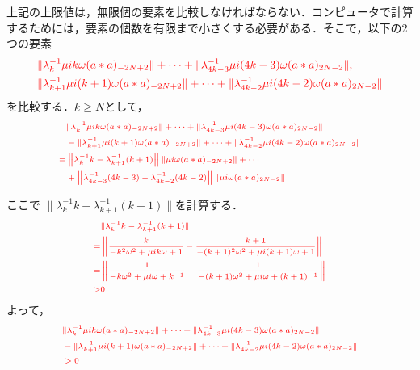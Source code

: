 \documentclass[11pt,a4paper,titlepage]{jsreport}
\theoremstyle{definition}
\providecommand{\DIFdel}[1]{{\protect\color{red} \scriptsize #1}} %
\begin{document}
\begin{enumerate}
\DIFdel{上記の上限値は，無限個の要素を比較しなければならない．コンピュータで計算するためには，要素の個数を有限まで小さくする必要がある．そこで，以下の2つの要素
}\begin{align*}
  &\DIFdel{\|\lambda^{-1}_{k}  \mu i k \omega (a*a)_{-2N+2}\| + \cdots + \|\lambda^{-1}_{4k-3} \mu i (4k-3) \omega (a*a)_{2N-2}\|,}\\
  &\DIFdel{\|\lambda^{-1}_{k+1}  \mu i (k+1) \omega (a*a)_{-2N+2}\| + \cdots + \|\lambda^{-1}_{4k-2} \mu i (4k-2) \omega (a*a)_{2N-2}\|
}\end{align*}%
\DIFdel{を比較する．$k\geq N$として，
}\begin{displaymath}
  \DIFdel{\begin{split}
    &\|\lambda^{-1}_{k}  \mu i k \omega (a*a)_{-2N+2}\| + \cdots + \|\lambda^{-1}_{4k-3} \mu i (4k-3) \omega (a*a)_{2N-2}\|\\
    &-\|\lambda^{-1}_{k+1}  \mu i (k+1) \omega (a*a)_{-2N+2}\| + \cdots + \|\lambda^{-1}_{4k-2} \mu i (4k-2) \omega (a*a)_{2N-2}\|\\
    =& \left\| \lambda^{-1}_{k}k - \lambda^{-1}_{k+1}(k+1) \right\| \| \mu i \omega (a*a)_{-2N+2}\|+ \cdots \\
    &+ \left\| \lambda^{-1}_{4k-3}(4k-3) - \lambda^{-1}_{4k-2}(4k-2) \right\| \| \mu i \omega (a*a)_{2N-2}\|
  \end{split}
}\end{displaymath}%

\DIFdel{ここで $ \|\lambda^{-1}_{k}k - \lambda^{-1}_{k+1}(k+1) \|$を計算する．
}\begin{displaymath}
  \DIFdel{\begin{split}
    &\|\lambda^{-1}_{k}k - \lambda^{-1}_{k+1}(k+1) \|\\
    =& \left\|\frac{k}{-k^2\omega^2 + \mu i k \omega+ 1} - \frac{k+1}{-(k+1)^2\omega^2 + \mu i (k+1) \omega+ 1}\right\|\\
    =& \left\|\frac{1}{-k\omega^2 + \mu i  \omega+ k^{-1}} - \frac{1}{-(k+1)\omega^2 + \mu i \omega+ (k+1)^{-1}}\right\|\\
    >& 0
  \end{split}
}\end{displaymath}%
\DIFdel{よって，
}\begin{displaymath}
  \DIFdel{\begin{split}
    &\|\lambda^{-1}_{k}  \mu i k \omega (a*a)_{-2N+2}\| + \cdots + \|\lambda^{-1}_{4k-3} \mu i (4k-3) \omega (a*a)_{2N-2}\|\\
    &-\|\lambda^{-1}_{k+1}  \mu i (k+1) \omega (a*a)_{-2N+2}\| + \cdots + \|\lambda^{-1}_{4k-2} \mu i (4k-2) \omega (a*a)_{2N-2}\|\\
    &> 0
  \end{split}
}\end{displaymath}%


\end{enumerate}
\end{document}
